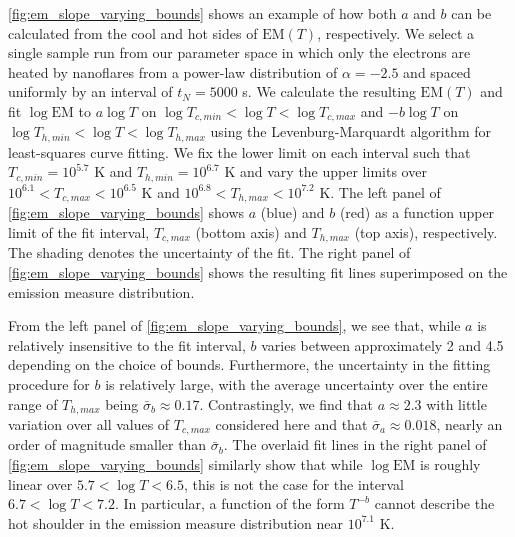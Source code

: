\documentclass[preprint,linenumbers]{aastex}
\begin{document}
	\par\autoref{fig:em_slope_varying_bounds} shows an example of how both $a$ and $b$ can be calculated from the cool and hot sides of $\mathrm{EM}(T)$, respectively. We select a single sample run from our parameter space in which only the electrons are heated by nanoflares from a power-law distribution of $\alpha=-2.5$ and spaced uniformly by an interval of $t_N=5000$ s. We calculate the resulting $\mathrm{EM}(T)$ and fit $\log{\mathrm{EM}}$ to $a\log{T}$ on $\log{T_{c,min}}<\log{T}<\log{T_{c,max}}$ and $-b\log{T}$ on $\log{T_{h,min}}<\log{T}<\log{T_{h,max}}$ using the Levenburg-Marquardt algorithm for least-squares curve fitting. We fix the lower limit on each interval such that $T_{c,min}=10^{5.7}$ K and $T_{h,min} = 10^{6.7}$  K and vary the upper limits over $10^{6.1}<T_{c,max}<10^{6.5}$ K and $10^{6.8}<T_{h,max}<10^{7.2}$ K. The left panel of \autoref{fig:em_slope_varying_bounds} shows $a$ (blue) and $b$ (red) as a function upper limit of the fit interval, $T_{c,max}$ (bottom axis) and $T_{h,max}$ (top axis), respectively. The shading denotes the uncertainty of the fit. The right panel of \autoref{fig:em_slope_varying_bounds} shows the resulting fit lines superimposed on the emission measure distribution.
	\par From the left panel of \autoref{fig:em_slope_varying_bounds}, we see that, while $a$ is relatively insensitive to the fit interval, $b$ varies between approximately 2 and 4.5 depending on the choice of bounds. Furthermore, the uncertainty in the fitting procedure for $b$ is relatively large, with the average uncertainty over the entire range of $T_{h,max}$ being $\bar{\sigma}_b\approx0.17$. Contrastingly, we find that $a\approx2.3$ with little variation over all values of $T_{c,max}$ considered here and that $\bar{\sigma}_a\approx0.018$, nearly an order of magnitude smaller than $\bar{\sigma}_b$. The overlaid fit lines in the right panel of \autoref{fig:em_slope_varying_bounds} similarly show that while $\log{\mathrm{EM}}$ is roughly linear over $5.7<\log{T}<6.5$, this is not the case for the interval $6.7<\log{T}<7.2$. In particular, a function of the form $T^{-b}$ cannot describe the hot shoulder in the emission measure distribution near $10^{7.1}$ K.
\end{document}
